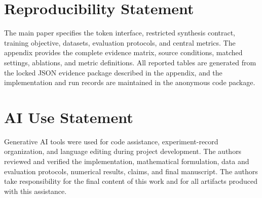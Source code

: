 \section*{Reproducibility Statement}

The main paper specifies the token interface, restricted synthesis contract,
training objective, datasets, evaluation protocols, and central metrics. The
appendix provides the complete evidence matrix, source conditions, matched
settings, ablations, and metric definitions. All reported tables are generated
from the locked JSON evidence package described in the appendix, and the
implementation and run records are maintained in the anonymous code package.

\section*{AI Use Statement}

Generative AI tools were used for code assistance, experiment-record
organization, and language editing during project development. The authors
reviewed and verified the implementation, mathematical formulation, data and
evaluation protocols, numerical results, claims, and final manuscript. The
authors take responsibility for the final content of this work and for all
artifacts produced with this assistance.

